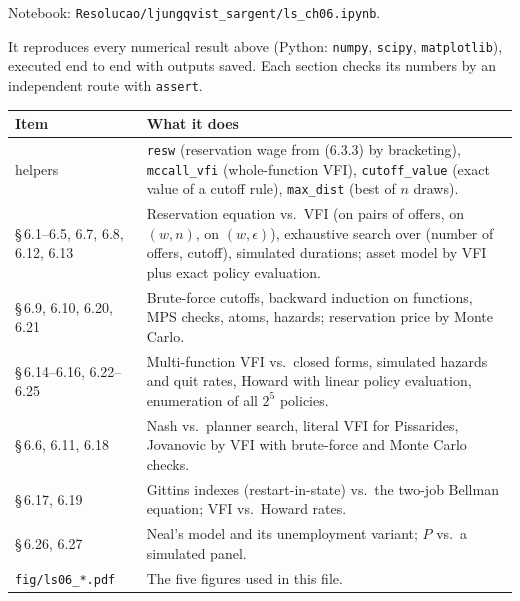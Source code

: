 \documentclass[12pt, letterpaper]{article}
\begin{document}
Notebook: \texttt{Resolucao/ljungqvist\_sargent/ls\_ch06.ipynb}.

It reproduces every numerical result above (Python: \texttt{numpy}, \texttt{scipy}, \texttt{matplotlib}), executed end to
end with outputs saved. Each section checks its numbers by an independent route with \texttt{assert}.

\begin{center}
\begin{tabular}{@{}p{3.6cm}p{11.2cm}@{}}
\toprule
\textbf{Item} & \textbf{What it does} \\
\midrule
helpers & \texttt{resw} (reservation wage from (6.3.3) by bracketing), \texttt{mccall\_vfi} (whole-function VFI),
\texttt{cutoff\_value} (exact value of a cutoff rule), \texttt{max\_dist} (best of $n$ draws). \\
\S\,6.1--6.5, 6.7, 6.8, 6.12, 6.13 & Reservation equation vs.\ VFI (on pairs of offers, on $(w,n)$, on $(w,\epsilon)$), exhaustive
search over (number of offers, cutoff), simulated durations; asset model by VFI plus exact policy evaluation. \\
\S\,6.9, 6.10, 6.20, 6.21 & Brute-force cutoffs, backward induction on functions, MPS checks, atoms, hazards;
reservation price by Monte Carlo. \\
\S\,6.14--6.16, 6.22--6.25 & Multi-function VFI vs.\ closed forms, simulated hazards and quit rates, Howard with
linear policy evaluation, enumeration of all $2^5$ policies. \\
\S\,6.6, 6.11, 6.18 & Nash vs.\ planner search, literal VFI for Pissarides, Jovanovic by VFI with brute-force and
Monte Carlo checks. \\
\S\,6.17, 6.19 & Gittins indexes (restart-in-state) vs.\ the two-job Bellman equation; VFI vs.\ Howard rates. \\
\S\,6.26, 6.27 & Neal's model and its unemployment variant; $P$ vs.\ a simulated panel. \\
\texttt{fig/ls06\_*.pdf} & The five figures used in this file. \\
\bottomrule
\end{tabular}
\end{center}
\end{document}
